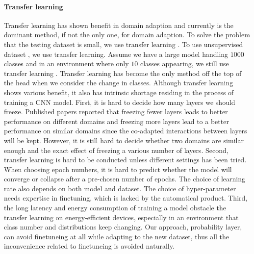 \documentclass[pageno]{jpaper}
\begin{document}
\paragraph{Transfer learning}
Transfer learning has shown benefit in domain adaption and currently is the dominant method, if not the only one, for domain adaption. To solve the problem that the testing dataset is small, we use transfer learning \cite{oquab2014learning}. To use unsupervised dataset \cite{doersch2015unsupervised, noroozi2016unsupervised}, we use transfer learning. Assume we have a large model handling $1000$ classes and in an environment where only $10$ classes appearing, we still use transfer learning \cite{han2016mcdnn, shen2016fast}. Transfer learning has become the only method off the top of the head when we consider the change in classes. Although transfer learning shows various benefit, it also has intrinsic shortage residing in the process of training a CNN model. First, it is hard to decide how many layers we should freeze. Published papers \cite{yosinski2014transferable} reported that freezing fewer layers leads to better performance on different domains and freezing more layers lead to a better performance on similar domains since the co-adapted interactions between layers will be kept. However, it is still hard to decide whether two domains are similar enough and the exact effect of freezing a various number of layers. Second, transfer learning is hard to be conducted unless different settings has been tried. When choosing epoch numbers, it is hard to predict whether the model will converge or collapse after a pre-chosen number of epochs. The choice of learning rate also depends on both model and dataset. The choice of hyper-parameter needs expertise in finetuning, which is lacked by the automatical product. Third, the long latency and energy consumption of training a model obstacle the transfer learning on energy-efficient devices, especially in an environment that class number and distributions keep changing. Our approach, probability layer, can avoid finetuneing at all while adapting to the new dataset, thus all the inconvenience related to finetuneing is avoided naturally.
\end{document}
